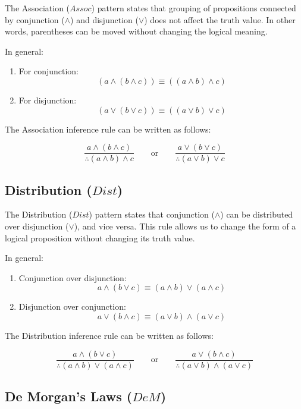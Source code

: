 \documentclass[12pt,a4paper,openany]{article}
\begin{document}
The Association (\(Assoc\)) pattern states that grouping of propositions connected by conjunction (\(\land\)) and disjunction (\(\lor\)) does not affect the truth value. In other words, parentheses can be moved without changing the logical meaning.

In general:

\begin{enumerate}
\item For conjunction:
  \[(a \land (b \land c)) \equiv ((a \land b) \land c)\]
\item For disjunction:
  \[(a \lor (b \lor c)) \equiv ((a \lor b) \lor c)\]
\end{enumerate}

The Association inference rule can be written as follows:

\[
\frac{a \land (b \land c)}{\therefore (a \land b) \land c}
\qquad \text{or} \qquad
\frac{a \lor (b \lor c)}{\therefore (a \lor b) \lor c}
\]

\subsection{Distribution (\(Dist\))}\label{distribution-dist}

The Distribution (\(Dist\)) pattern states that conjunction (\(\land\)) can be distributed over disjunction (\(\lor\)), and vice versa. This rule allows us to change the form of a logical proposition without changing its truth value.

In general:

\begin{enumerate}
\item Conjunction over disjunction:
  \[a \land (b \lor c) \equiv (a \land b) \lor (a \land c)\]
\item Disjunction over conjunction:
  \[a \lor (b \land c) \equiv (a \lor b) \land (a \lor c)\]
\end{enumerate}

The Distribution inference rule can be written as follows:

\[
\frac{a \land (b \lor c)}{\therefore (a \land b) \lor (a \land c)}
\qquad \text{or} \qquad
\frac{a \lor (b \land c)}{\therefore (a \lor b) \land (a \lor c)}
\]

\subsection{De Morgan's Laws (\(DeM\))}\label{de-morgans-laws-dem}
\end{document}
